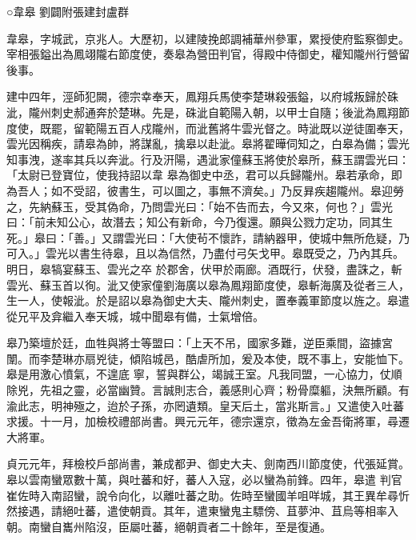 
\begin{pinyinscope}

 ○韋皋
 劉闢附張建封盧群



 韋皋，字城武，京兆人。大歷初，以建陵挽郎調補華州參軍，累授使府監察御史。宰相張鎰出為鳳翊隴右節度使，奏皋為營田判官，得殿中侍御史，權知隴州行營留
 後事。



 建中四年，涇師犯闕，德宗幸奉天，鳳翔兵馬使李楚琳殺張鎰，以府城叛歸於硃泚，隴州刺史郝通奔於楚琳。先是，硃泚自範陽入朝，以甲士自隨；後泚為鳳翔節度使，既罷，留範陽五百人戍隴州，而泚舊將牛雲光督之。時泚既以逆徒圍奉天，雲光因稱疾，請皋為帥，將謀亂，擒皋以赴泚。皋將翟曄伺知之，白皋為備；雲光知事洩，遂率其兵以奔泚。行及汧陽，遇泚家僮蘇玉將使於皋所，蘇玉謂雲光曰：「太尉已登寶位，使我持詔以韋
 皋為御史中丞，君可以兵歸隴州。皋若承命，即為吾人；如不受詔，彼書生，可以圖之，事無不濟矣。」乃反昪疾趨隴州。皋迎勞之，先納蘇玉，受其偽命，乃問雲光曰：「始不告而去，今又來，何也？」雲光曰：「前未知公心，故潛去；知公有新命，今乃復還。願與公戮力定功，同其生死。」皋曰：「善。」又謂雲光曰：「大使茍不懷詐，請納器甲，使城中無所危疑，乃可入。」雲光以書生待皋，且以為信然，乃盡付弓矢戈甲。皋既受之，乃內其兵。明日，皋犒宴蘇玉、雲光之卒
 於郡舍，伏甲於兩廊。酒既行，伏發，盡誅之，斬雲光、蘇玉首以徇。泚又使家僮劉海廣以皋為鳳翔節度使，皋斬海廣及從者三人，生一人，使報泚。於是詔以皋為御史大夫、隴州刺史，置奉義軍節度以旌之。皋遣從兄平及弇繼入奉天城，城中聞皋有備，士氣增倍。



 皋乃築壇於廷，血牲與將士等盟曰：「上天不吊，國家多難，逆臣乘間，盜據宮闈。而李楚琳亦扇兇徒，傾陷城邑，酷虐所加，爰及本使，既不事上，安能恤下。皋是用激心憤氣，不遑底
 寧，誓與群公，竭誠王室。凡我同盟，一心協力，仗順除兇，先祖之靈，必當幽贊。言誠則志合，義感則心齊；粉骨糜軀，決無所顧。有渝此志，明神殛之，迨於子孫，亦罔遺類。皇天后土，當兆斯言。」又遣使入吐蕃求援。十一月，加檢校禮部尚書。興元元年，德宗還京，徵為左金吾衛將軍，尋遷大將軍。



 貞元元年，拜檢校戶部尚書，兼成都尹、御史大夫、劍南西川節度使，代張延賞。皋以雲南蠻眾數十萬，與吐蕃和好，蕃人入寇，必以蠻為前鋒。四年，皋遣
 判官崔佐時入南詔蠻，說令向化，以離吐蕃之助。佐時至蠻國羊咀咩城，其王異牟尋忻然接遇，請絕吐蕃，遣使朝貢。其年，遣東蠻鬼主驃傍、苴夢沖、苴烏等相率入朝。南蠻自巂州陷沒，臣屬吐蕃，絕朝貢者二十餘年，至是復通。




\end{pinyinscope}
